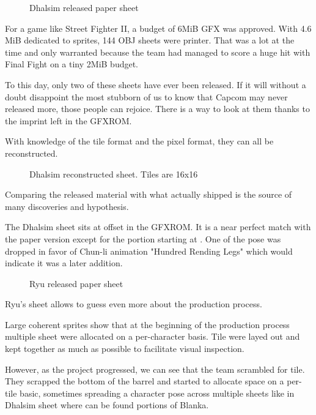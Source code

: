  \begin{figure}[H]
\caption*{Dhalsim released paper sheet}
\end{figure}

For a game like Street Fighter II, a budget of 6MiB GFX was approved. With 4.6 MiB dedicated to sprites, 144 OBJ sheets were printer. That was a lot at the time and only warranted because the team had managed to score a huge hit with Final Fight on a tiny 2MiB budget. 

To this day, only two of these sheets have ever been released\cite{ffdevinterview}\cite{htmcc}. If it will without a doubt disappoint the most stubborn of us to know that Capcom may never released more, those people can rejoice. There is a way to look at them thanks to the imprint left in the GFXROM. 

With knowledge of the tile format and the pixel format, they can all be reconstructed.




 \begin{figure}[H]
\caption*{Dhalsim reconstructed sheet. Tiles are 16x16}
\end{figure}

Comparing the released material with what actually shipped is the source of many discoveries and hypothesis. 


The Dhalsim sheet sits at offset  in the GFXROM. It is a near perfect match with the paper version except for the portion starting at . One of the pose was dropped in favor of Chun-li animation "Hundred Rending Legs" which would indicate it was a later addition. 

 \begin{figure}[H]
\caption*{Ryu released paper sheet}
\end{figure}

Ryu's sheet  allows to guess even more about the production process. 

Large coherent sprites show that at the beginning of the production process multiple sheet were allocated on a per-character basis. Tile were layed out and kept together as much as possible to facilitate visual inspection.

However, as the project progressed, we can see that the team scrambled for tile. They scrapped the bottom of the barrel and started to allocate space on a per-tile basic, sometimes spreading a character pose across multiple sheets like in Dhalsim sheet where can be found portions of Blanka.

